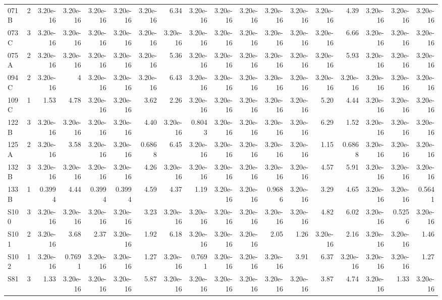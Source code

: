 \begin{table}[htbp]
{\begin{tabular}{lrrrrrrrrrrrrrrrrr}
    071B & 2 & 3.20e-16 & 3.20e-16 & 3.20e-16 & 3.20e-16 & 3.20e-16 & 6.34 & 3.20e-16 & 3.20e-16 & 3.20e-16 & 3.20e-16 & 3.20e-16 & 3.20e-16 & 4.39 & 3.20e-16 & 3.20e-16 & 3.20e-16 \\
    073C & 3 & 3.20e-16 & 3.20e-16 & 3.20e-16 & 3.20e-16 & 3.20e-16 & 3.20e-16 & 3.20e-16 & 3.20e-16 & 3.20e-16 & 3.20e-16 & 3.20e-16 & 3.20e-16 & 6.66 & 3.20e-16 & 3.20e-16 & 3.20e-16 \\
    075A & 2 & 3.20e-16 & 3.20e-16 & 3.20e-16 & 3.20e-16 & 3.20e-16 & 5.36 & 3.20e-16 & 3.20e-16 & 3.20e-16 & 3.20e-16 & 3.20e-16 & 3.20e-16 & 5.93 & 3.20e-16 & 3.20e-16 & 3.20e-16 \\
    094C & 2 & 3.20e-16 & 4 & 3.20e-16 & 3.20e-16 & 3.20e-16 & 6.43 & 3.20e-16 & 3.20e-16 & 3.20e-16 & 3.20e-16 & 3.20e-16 & 3.20e-16 & 3.20e-16 & 3.20e-16 & 3.20e-16 & 3.20e-16 \\
    109C & 1 & 1.53 & 4.78 & 3.20e-16 & 3.20e-16 & 3.62 & 2.26 & 3.20e-16 & 3.20e-16 & 3.20e-16 & 3.20e-16 & 3.20e-16 & 5.20 & 4.44 & 3.20e-16 & 3.20e-16 & 3.20e-16 \\
    122B & 3 & 3.20e-16 & 3.20e-16 & 3.20e-16 & 3.20e-16 & 4.40 & 3.20e-16 & 0.8043 & 3.20e-16 & 3.20e-16 & 3.20e-16 & 3.20e-16 & 6.29 & 1.52 & 3.20e-16 & 3.20e-16 & 3.20e-16 \\
    125A & 2 & 3.20e-16 & 3.58 & 3.20e-16 & 3.20e-16 & 0.6868 & 6.45 & 3.20e-16 & 3.20e-16 & 3.20e-16 & 3.20e-16 & 3.20e-16 & 1.15 & 0.6868 & 3.20e-16 & 3.20e-16 & 3.20e-16 \\
    132B & 3 & 3.20e-16 & 3.20e-16 & 3.20e-16 & 3.20e-16 & 4.26 & 3.20e-16 & 3.20e-16 & 3.20e-16 & 3.20e-16 & 3.20e-16 & 3.20e-16 & 4.57 & 5.91 & 3.20e-16 & 3.20e-16 & 3.20e-16 \\
    133B & 1 & 0.3994 & 4.44 & 0.3994 & 0.3994 & 4.59 & 4.37 & 1.19 & 3.20e-16 & 3.20e-16 & 0.9686 & 3.20e-16 & 3.29 & 4.65 & 3.20e-16 & 3.20e-16 & 0.5641 \\
    S100 & 3 & 3.20e-16 & 3.20e-16 & 3.20e-16 & 3.20e-16 & 3.23 & 3.20e-16 & 3.20e-16 & 3.20e-16 & 3.20e-16 & 3.20e-16 & 3.20e-16 & 4.82 & 6.02 & 3.20e-16 & 0.5256 & 3.20e-16 \\
    S101 & 2 & 3.20e-16 & 3.68 & 2.37 & 3.20e-16 & 1.92 & 6.18 & 3.20e-16 & 3.20e-16 & 3.20e-16 & 2.05 & 1.26 & 3.20e-16 & 2.16 & 3.20e-16 & 3.20e-16 & 1.46 \\
    S102 & 1 & 3.20e-16 & 0.7691 & 3.20e-16 & 3.20e-16 & 1.27 & 3.20e-16 & 0.7691 & 3.20e-16 & 3.20e-16 & 3.20e-16 & 3.91 & 6.37 & 3.20e-16 & 3.20e-16 & 3.20e-16 & 1.27 \\
    S81 & 3 & 1.33 & 3.20e-16 & 3.20e-16 & 3.20e-16 & 5.87 & 3.20e-16 & 3.20e-16 & 3.20e-16 & 3.20e-16 & 3.20e-16 & 3.20e-16 & 3.87 & 4.74 & 3.20e-16 & 1.33 & 3.20e-16 \\

\end{tabular}}
\end{table}
